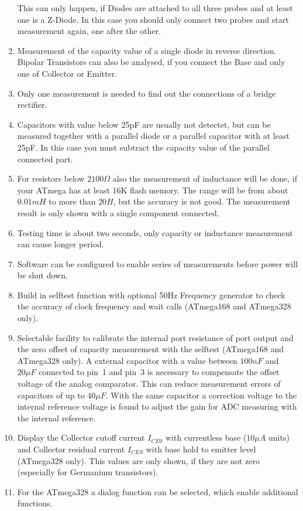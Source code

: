 \begin{enumerate}
 This can only happen, if Diodes are attached to all three probes and at least one is a Z-Diode.
In this case you should only connect two probes and start measurement again, one after the other.
\item Measurement of the capacity value of a single diode in reverse direction.
Bipolar Transistors can also be analysed, if you connect the Base and only one of Collector or Emitter.
\item Only one measurement is needed to find out the connections of a bridge rectifier.
\item Capacitors with value below 25pF are usually not detectet, but can be measured together with
a parallel diode or a parallel capacitor with at least 25pF.
In this case you must subtract the capacity value of the parallel connected part.
\item For resistors below \(2100 \Omega\) also the measurement of inductance will be done, if
your ATmega has at least 16K flash memory.
The range will be from about \(0.01 mH\) to more than \(20 H\), but the accuracy is not good.
The measurement result is only shown with a single component connected.
\item Testing time is about two seconds, only capacity or inductance measurement can cause longer period.
\item Software can be configured to enable series of measurements before power will be shut down.
\item Build in selftest function with optional 50Hz Frequency generator to check the accuracy of clock frequency and wait calls (ATmega168 and ATmega328 only).
\item Selectable facility to calibrate the internal port resistance of port output and
the zero offset of capacity measurement with the selftest (ATmega168 and ATmega328 only).
A external capacitor with a value between \(100 nF\) 
and \(20 \mu F\) connected to pin~1 and pin~3 is necessary to compensate the offset voltage of the analog comparator.
This can reduce measurement errors of capacitors of up to \(40 \mu F\).
With the same capacitor a correction voltage to the internal reference voltage is found to adjust the
gain for ADC measuring with the internal reference.
\item Display the Collector cutoff current \(I_{CE0}\) with currentless base (\(10\mu A\) units) and
Collector residual current \(I_{CES}\) with base hold to emitter level (ATmega328 only).
This values are only shown, if they are not zero (especially for Germanium transistors).
\item For the ATmega328 a dialog function can be selected, which enable additional functions.

\end{enumerate}
